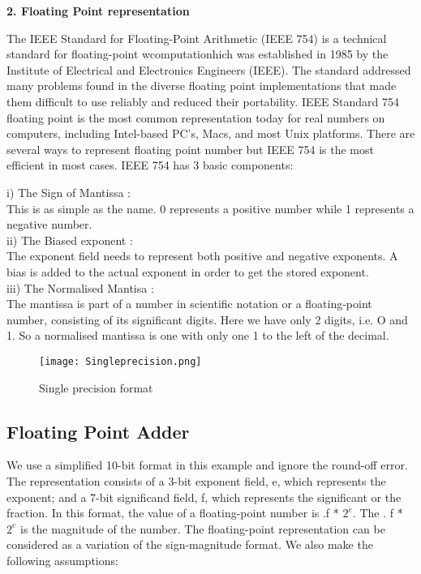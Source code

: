 \documentclass{article}
\begin{document}
\bigskip 
\bigskip 
\bigskip 


                                             
\textbf{2. Floating Point representation}
\bigskip 
 
	The IEEE Standard for Floating-Point Arithmetic (IEEE 754) is a technical standard for floating-point  wcomputationhich was established in 1985 by the Institute of Electrical and Electronics Engineers (IEEE). The standard addressed many problems found in the diverse floating point implementations that made them difficult to use reliably and reduced their portability. IEEE Standard 754 floating point is the most common representation today for real numbers on computers, including Intel-based PC’s, Macs, and most Unix platforms.
There are several ways to represent floating point number but IEEE 754 is the most efficient in most cases. IEEE 754 has 3 basic components:\\
\textbf{           }  

i) The Sign of Mantissa :\\This is as simple as the name. 0 represents a positive number while 1 represents a negative number.\\

 ii) The Biased exponent :\\
The exponent field needs to represent both positive and negative exponents. A bias is added to the actual exponent in order to get the stored exponent.\\

iii) The Normalised Mantisa :\\
The mantissa is part of a number in scientific notation or a floating-point number, consisting of its significant digits. Here we have only 2 digits, i.e. O and 1. So a normalised mantissa is one with only one 1 to the left of the decimal.
\bigskip 
\begin{figure}[htp]
\texttt{[image: Singleprecision.png]}
\caption{Single precision format}
\end{figure}

\begin{center}
\section{ Floating Point Adder}
\end{center}
\bigskip 
  	
  	    We use a simplified 10-bit format in this example and ignore the round-off error. The representation consists of a 3-bit exponent field, e, which represents the exponent; and a 7-bit significand field, f, which represents the significant or the fraction. In this format, the value of a floating-point number is  .f * $2^e$. The . f * $2^e$ is the magnitude of the number. The floating-point representation can be considered as a variation of the sign-magnitude format. We also make the following assumptions:\\
 
\end{document}
